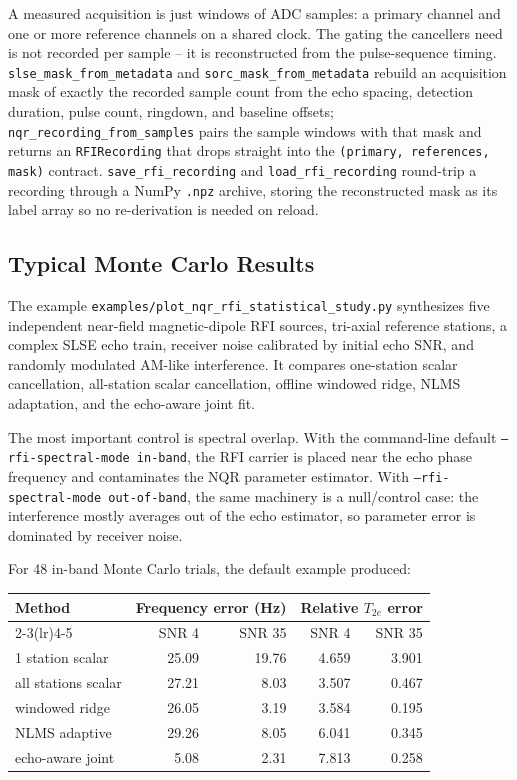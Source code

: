 \documentclass[11pt,oneside]{report}
\newcommand{\code}[1]{\texttt{#1}}
\begin{document}
A measured acquisition is just windows of ADC samples: a primary channel and one
or more reference channels on a shared clock. The gating the cancellers need is
not recorded per sample -- it is reconstructed from the pulse-sequence timing.
\code{slse\_mask\_from\_metadata} and \code{sorc\_mask\_from\_metadata} rebuild an
acquisition mask of exactly the recorded sample count from the echo spacing,
detection duration, pulse count, ringdown, and baseline offsets;
\code{nqr\_recording\_from\_samples} pairs the sample windows with that mask and
returns an \code{RFIRecording} that drops straight into the
\code{(primary, references, mask)} contract. \code{save\_rfi\_recording} and
\code{load\_rfi\_recording} round-trip a recording through a NumPy \code{.npz}
archive, storing the reconstructed mask as its label array so no re-derivation is
needed on reload.

\subsection{Typical Monte Carlo Results}

The example
\code{examples/plot\_nqr\_rfi\_statistical\_study.py} synthesizes five
independent near-field magnetic-dipole RFI sources, tri-axial reference
stations, a complex SLSE echo train, receiver noise calibrated by initial echo
SNR, and randomly modulated AM-like interference. It compares one-station
scalar cancellation, all-station scalar cancellation, offline windowed ridge,
NLMS adaptation, and the echo-aware joint fit.

The most important control is spectral overlap. With the command-line default
\code{--rfi-spectral-mode in-band}, the RFI carrier is placed near the echo
phase frequency and contaminates the NQR parameter estimator. With
\code{--rfi-spectral-mode out-of-band}, the same machinery is a null/control
case: the interference mostly averages out of the echo estimator, so parameter
error is dominated by receiver noise.

For 48 in-band Monte Carlo trials, the default example produced:

\begin{center}
\begin{tabular}{lrrrr}
\toprule
Method & \multicolumn{2}{c}{Frequency error (Hz)} &
\multicolumn{2}{c}{Relative \(T_{2e}\) error} \\
\cmidrule(lr){2-3}\cmidrule(lr){4-5}
& SNR 4 & SNR 35 & SNR 4 & SNR 35 \\
\midrule
1 station scalar & 25.09 & 19.76 & 4.659 & 3.901 \\
all stations scalar & 27.21 & 8.03 & 3.507 & 0.467 \\
windowed ridge & 26.05 & 3.19 & 3.584 & 0.195 \\
NLMS adaptive & 29.26 & 8.05 & 6.041 & 0.345 \\
echo-aware joint & 5.08 & 2.31 & 7.813 & 0.258 \\
\bottomrule
\end{tabular}
\end{center}
\end{document}
